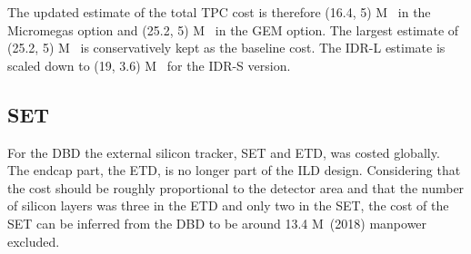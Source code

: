 The updated estimate of the total TPC cost is therefore (16.4, 5) M\texteuro~ in the Micromegas option and (25.2, 5) M\texteuro~ in the GEM option. 
The largest estimate of (25.2, 5) M\texteuro~ is conservatively kept as the baseline cost. The IDR-L estimate is scaled down to (19, 3.6) M\texteuro~ for the IDR-S version.

\subsection{SET}
For the DBD the external silicon tracker, SET and ETD, was costed globally. The endcap part, the ETD, is no longer part of the ILD design. Considering that the cost should be roughly proportional to the detector area and that the number of silicon layers was three in the ETD and only two in the SET, the  cost of the SET can be inferred from the DBD to be around 13.4 M\texteuro~(2018) manpower excluded.

